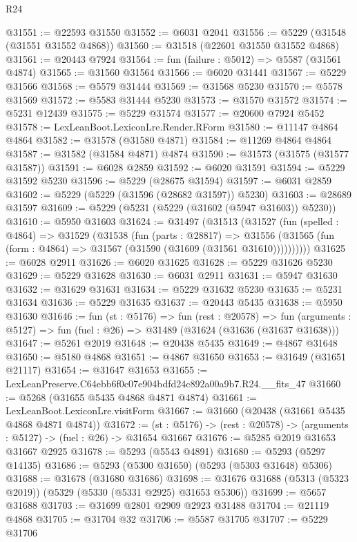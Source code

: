 \begin{lexlean}{R24}
\begin{coremodule}
@31551 := @22593 @31550
@31552 := @6031 @2041
@31556 := @5229 (@31548 (@31551 @31552 @4868))
@31560 := @31518 (@22601 @31550 @31552 @4868)
@31561 := @20443 @7924
@31564 := fun (failure : @5012) => @5587 (@31561 @4874)
@31565 := @31560 @31564
@31566 := @6020 @31441
@31567 := @5229 @31566
@31568 := @5579 @31444
@31569 := @31568 @5230
@31570 := @5578 @31569
@31572 := @5583 @31444 @5230
@31573 := @31570 @31572
@31574 := @5231 @12439
@31575 := @5229 @31574
@31577 := @20600 @7924 @5452
@31578 := LexLeanBoot.LexiconLre.Render.RForm
@31580 := @11147 @4864 @4864
@31582 := @31578 (@31580 @4871)
@31584 := @11269 @4864 @4864
@31587 := @31582 (@31584 @4871) @4874
@31590 := @31573 (@31575 (@31577 @31587))
@31591 := @6028 @2859
@31592 := @6020 @31591
@31594 := @5229 @31592 @5230
@31596 := @5229 (@28675 @31594)
@31597 := @6031 @2859
@31602 := @5229 (@5229 (@31596 (@28682 @31597)) @5230)
@31603 := @28689 @31597
@31609 := @5229 (@5231 (@5229 (@31602 (@5947 @31603)) @5230))
@31610 := @5950 @31603
@31624 := @31497
    (@31513
      (@31527
        (fun (spelled : @4864) =>
        @31529
          (@31538
            (fun (parts : @28817) =>
            @31556 (@31565 (fun (form : @4864) => @31567 (@31590 (@31609 (@31561 @31610))))))))))
@31625 := @6028 @2911
@31626 := @6020 @31625
@31628 := @5229 @31626 @5230
@31629 := @5229 @31628
@31630 := @6031 @2911
@31631 := @5947 @31630
@31632 := @31629 @31631
@31634 := @5229 @31632 @5230
@31635 := @5231 @31634
@31636 := @5229 @31635
@31637 := @20443 @5435
@31638 := @5950 @31630
@31646 := fun (st : @5176) =>
  fun (rest : @20578) =>
  fun (arguments : @5127) => fun (fuel : @26) => @31489 (@31624 (@31636 (@31637 @31638)))
@31647 := @5261 @2019
@31648 := @20438 @5435
@31649 := @4867 @31648
@31650 := @5180 @4868
@31651 := @4867 @31650
@31653 := @31649 (@31651 @21117)
@31654 := @31647 @31653
@31655 := LexLeanPreserve.C64ebb6f0c07e904bdfd24c892a00a9b7.R24.__fits_47
@31660 := @5268 (@31655 @5435 @4868 @4871 @4874)
@31661 := LexLeanBoot.LexiconLre.visitForm
@31667 := @31660 (@20438 (@31661 @5435 @4868 @4871 @4874))
@31672 := (st : @5176) -> (rest : @20578) -> (arguments : @5127) -> (fuel : @26) -> @31654 @31667
@31676 := @5285 @2019 @31653 @31667 @2925
@31678 := @5293 (@5543 @4891)
@31680 := @5293 (@5297 @14135)
@31686 := @5293 (@5300 @31650) (@5293 (@5303 @31648) @5306)
@31688 := @31678 (@31680 @31686)
@31698 := @31676 @31688 (@5313 (@5323 @2019)) (@5329 (@5330 (@5331 @2925) @31653 @5306))
@31699 := @5657 @31688
@31703 := @31699 @2801 @2909 @2923 @31488
@31704 := @21119 @4868
@31705 := @31704 @32
@31706 := @5587 @31705
@31707 := @5229 @31706

\end{coremodule}
\end{lexlean}
